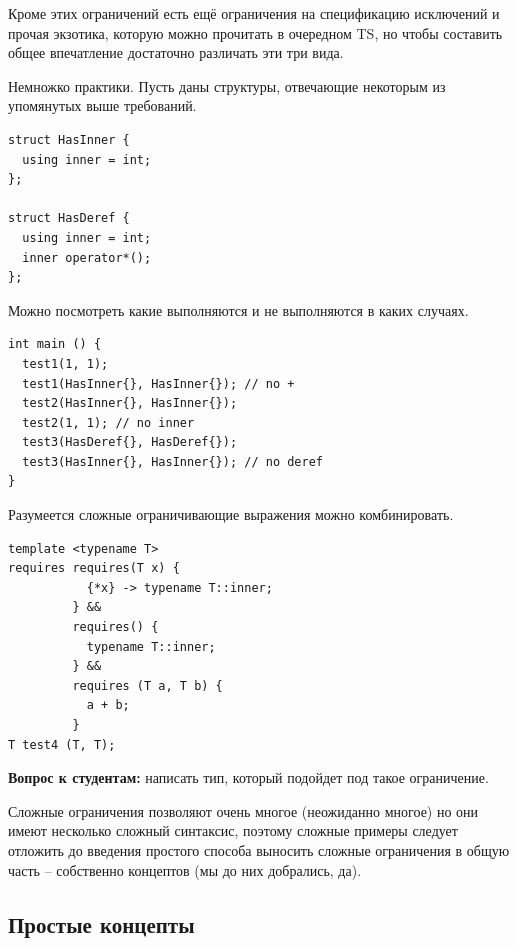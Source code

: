 \documentclass[a4paper,12pt,oneside]{book}
\newif\ifanswers
\begin{document}
Кроме этих ограничений есть ещё ограничения на спецификацию исключений и прочая экзотика, которую можно прочитать в очередном TS, но чтобы составить общее впечатление достаточно различать эти три вида.

Немножко практики. Пусть даны структуры, отвечающие некоторым из упомянутых выше требований.

\begin{lstlisting}
struct HasInner {
  using inner = int;
};

struct HasDeref {
  using inner = int;
  inner operator*();
};
\end{lstlisting}

Можно посмотреть какие выполняются и не выполняются в каких случаях.

\begin{lstlisting}
int main () {
  test1(1, 1);
  test1(HasInner{}, HasInner{}); // no +
  test2(HasInner{}, HasInner{});
  test2(1, 1); // no inner
  test3(HasDeref{}, HasDeref{});
  test3(HasInner{}, HasInner{}); // no deref
}
\end{lstlisting}

Разумеется сложные ограничивающие выражения можно комбинировать.

\begin{lstlisting}
template <typename T>
requires requires(T x) {
           {*x} -> typename T::inner;
         } &&
         requires() {
           typename T::inner;
         } &&
         requires (T a, T b) {
           a + b;
         }
T test4 (T, T);
\end{lstlisting}

\textbf{Вопрос к студентам:} написать тип, который подойдет под такое ограничение.

\ifanswers
Вариант ответа:
\begin{lstlisting}
struct HasPlus {
  using inner = int;
  inner operator*();
  void operator+(HasPlus x);
};
\end{lstlisting}
\fi

Сложные ограничения позволяют очень многое (неожиданно многое) но они имеют несколько сложный синтаксис, поэтому сложные примеры следует отложить до введения простого способа выносить сложные ограничения в общую часть -- собственно концептов (мы до них добрались, да).

\subsection{Простые концепты}
\end{document}
